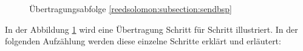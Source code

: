 \begin{figure}
	\centering
	\caption{Übertragungsabfolge \ref{reedsolomon:subsection:sendbsp}}
	\label{fig:sendorder}
\end{figure}
In der Abbildung \ref{fig:sendorder} wird eine Übertragung Schritt für Schritt illustriert.
In der folgenden Aufzählung werden diese einzelne Schritte erklärt und erläutert:
